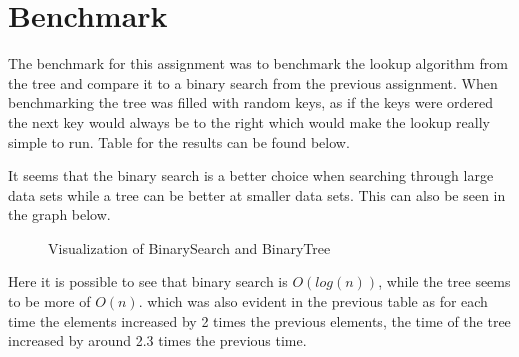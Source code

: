 \documentclass[a4paper,11pt]{article}
\begin{document}
\section*{Benchmark}
The benchmark for this assignment was to benchmark the lookup algorithm from the tree and compare it to a binary search from the previous assignment. 
When benchmarking the tree was filled with random keys, as if the keys were ordered the next key would always be to the right which would make the lookup really simple to run.
Table for the results can be found below.
\begin{table}[h]
    \begin{center}
    \caption{The result of Binary tree comapred to binary search}
    \label{tab:table1}
    \end{center}
\end{table}
\FloatBarrier{\noindent}
It seems that the binary search is a better choice when searching through large data sets while a tree can be better at smaller data sets.
This can also be seen in the graph below.




\begin{figure}[h]
    \centering    
    
    \scalebox{0.8}{}
    \caption{Visualization of BinarySearch and BinaryTree}   
    \label{tab:figure1} 
    
    \end{figure}
\noindent
Here it is possible to see that binary search is $O(log(n))$, while the tree seems to be more of $O(n)$. which was also evident in the previous table as for each time the elements increased by 2 times the previous elements, the time of the tree increased by around 2.3 times the previous time.
\end{document}
